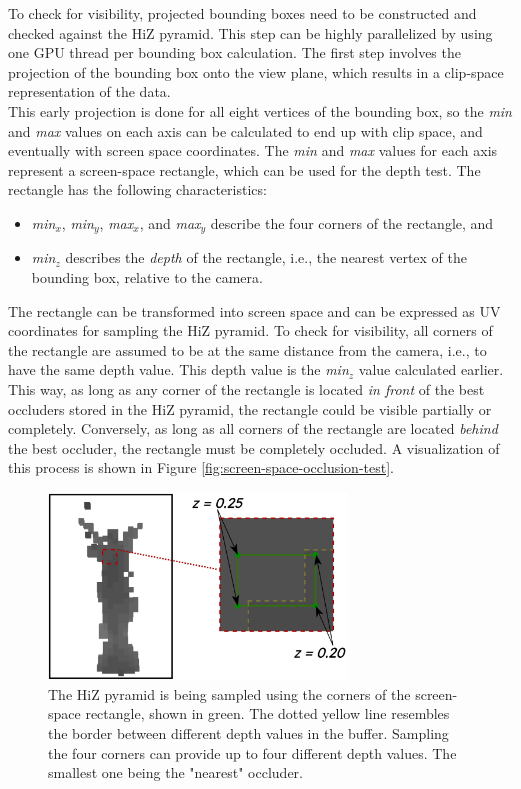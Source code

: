 \noindent
To check for visibility, projected bounding boxes need to be constructed and checked against the 
\ac{HiZ} pyramid. This step can be highly parallelized by using one \ac{GPU} thread per bounding box 
calculation. The first step involves the projection of the bounding box onto the view plane, which results 
in a clip-space representation of the data. \\

\noindent
This early projection is done for all eight vertices of the 
bounding box, so the \emph{min} and \emph{max} values on each axis can be calculated to end up with clip space, 
and eventually with screen space coordinates. The \emph{min} and \emph{max} values for each axis represent 
a screen-space rectangle, which can be used for the depth test. The rectangle has the following characteristics:

\begin{itemize}
    \item \emph{min$_{x}$}, \emph{min$_{y}$}, \emph{max$_{x}$}, and \emph{max$_{y}$} describe the four corners of the rectangle, and
    \item \emph{min$_{z}$} describes the \emph{depth} of the rectangle, i.e., the nearest vertex of the bounding box, relative to the camera.
\end{itemize}

\noindent
The rectangle can be transformed into screen space and can be expressed as UV coordinates for sampling the 
\ac{HiZ} pyramid. To check for visibility, all corners of the rectangle are assumed to be at the same distance 
from the camera, i.e., to have the same depth value. This depth value is the \emph{min$_{z}$} value calculated earlier.
This way, as long as any corner of the rectangle is located \emph{in front} of the best occluders stored in the 
\ac{HiZ} pyramid, the rectangle could be visible partially or completely. Conversely, as long as all corners of 
the rectangle are located \emph{behind} the best occluder, the rectangle must be completely occluded. A visualization of 
this process is shown in Figure \ref{fig:screen-space-occlusion-test}. \\

\begin{figure}[htbp]
    \centering
    \includegraphics[width=300px]{images/graphics/visibility-hiz-sampling.jpg}
    \caption{The \ac{HiZ} pyramid is being sampled using the corners of the screen-space rectangle, shown in green. 
    The dotted yellow line resembles the border between different depth values in the buffer. Sampling the four 
    corners can provide up to four different depth values. The smallest one being the "nearest" occluder.}
    \label{fig:visibility-hiz-sampling}
\end{figure}

